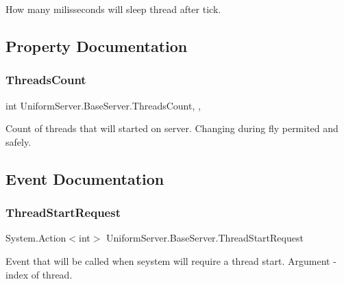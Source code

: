 How many milisseconds will sleep thread after tick. 



\subsection{Property Documentation}
\mbox{\label{class_uniform_server_1_1_base_server_a31cc7d436bb2dd344ec275fd0fa0061e}} 
\subsubsection{\texorpdfstring{Threads\+Count}{ThreadsCount}}
{\footnotesize\ttfamily int Uniform\+Server.\+Base\+Server.\+Threads\+Count\hspace{0.3cm}{\ttfamily [static]}, {\ttfamily [get]}, {\ttfamily [set]}}



Count of threads that will started on server. Changing during fly permited and safely. 



\subsection{Event Documentation}
\mbox{\label{class_uniform_server_1_1_base_server_a440a854a955ab7c5e563918c12e9b32c}} 
\subsubsection{\texorpdfstring{Thread\+Start\+Request}{ThreadStartRequest}}
{\footnotesize\ttfamily System.\+Action$<$int$>$ Uniform\+Server.\+Base\+Server.\+Thread\+Start\+Request\hspace{0.3cm}{\ttfamily [static]}}



Event that will be called when seystem will require a thread start. Argument -\/ index of thread. 

